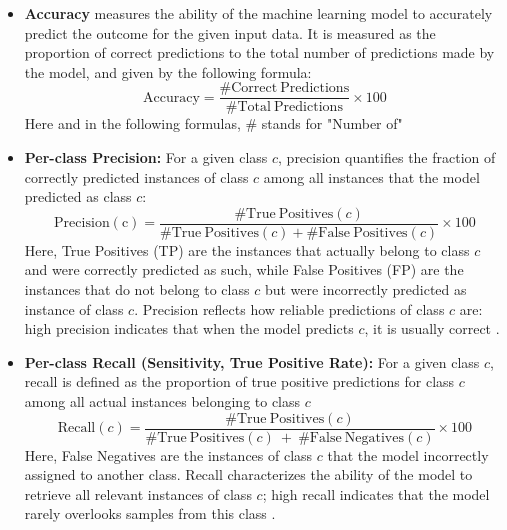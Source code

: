 \documentclass[gmd, manuscript]{copernicus}
\begin{document}
\begin{itemize}
\item  \textbf{Accuracy} measures the ability of the machine learning model to accurately predict the outcome for the given input data. It is measured as the proportion of correct predictions to the total number of predictions made by the model, and given by the following formula:
$$\mathrm{Accuracy} = \frac{\#\mathrm{Correct ~Predictions}}{\# \mathrm{Total~ Predictions}
}\times 100$$
Here and in the following formulas, \# stands for "Number of"
\item \textbf{Per-class Precision:} For a given class $c$, precision quantifies the fraction of correctly predicted instances of class $c$ among all instances that the model predicted as class $c$:
$$
\mathrm{Precision(c)} = \frac{\#\mathrm{True~Positives}(c)}{\#\mathrm{True~Positives}(c) + \#\mathrm{False~Positives}(c)}\times 100$$
    Here, True Positives (TP) are the instances that actually belong to class $c$ and were correctly predicted as such, while False Positives (FP) are the instances that do not belong to class $c$ but were incorrectly predicted as instance of class $c$. Precision reflects how reliable predictions of class $c$ are: high precision indicates that when the model predicts $c$, it is usually correct \citep{powers2020evaluation, brodersen2010balanced}.
\item \textbf{Per-class Recall (Sensitivity, True Positive Rate):}  
For a given class $c$, recall is defined as the proportion of true positive predictions for class $c$ among all actual instances belonging to class $c$
$$
\mathrm{Recall}(c) = \frac{\#\mathrm{True~Positives}(c)}{\#\mathrm{True~Positives}(c)~ + ~\#\mathrm{False~Negatives}(c)} \times 100$$ Here, False Negatives are the instances of class $c$ that the model incorrectly assigned to another class. 
Recall characterizes the ability of the model to retrieve all relevant instances of class $c$; high recall indicates that the model rarely overlooks samples from this class \citep{powers2020evaluation}.


\end{itemize}
\end{document}
